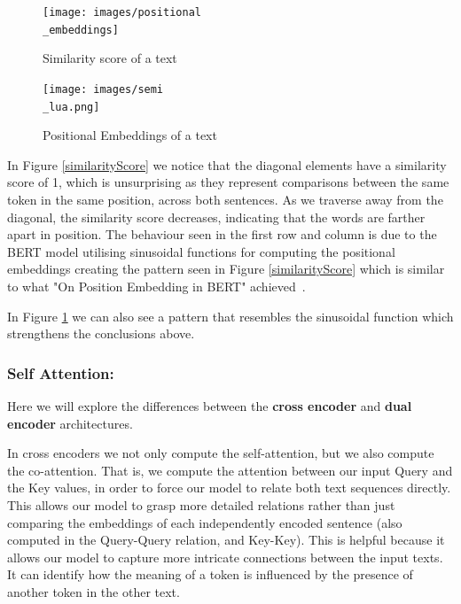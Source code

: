 \documentclass[runningheads]{llncs}
\begin{document}
\begin{figure}[htbp]
    \centering
    \begin{minipage}{0.5\textwidth}
        \centering
        \texttt{[image: images/positional\\\_embeddings]}
        \caption{Similarity score of a text}
        \label{similarityScore}
    \end{minipage}\hfill
    \begin{minipage}{0.45\textwidth}
        \centering
        \texttt{[image: images/semi\\\_lua.png]}
        \caption{Positional Embeddings of a text}
         \label{posEmb}
    \end{minipage}
\end{figure}

In Figure \ref{similarityScore} we notice that the diagonal elements have a similarity score of 1, which is unsurprising as they represent comparisons between the same token in the same position, across both sentences. As we traverse away from the diagonal, the similarity score decreases, indicating that the words are farther apart in position. The behaviour seen in the first row and column is due to the BERT model utilising sinusoidal functions for computing the positional embeddings creating the pattern seen in Figure \ref{similarityScore} which is similar to what "On Position Embedding in BERT" achieved~\cite{wang2021on}.

In Figure \ref{posEmb} we can also see a pattern that resembles the sinusoidal function which strengthens the conclusions above.
\subsubsection{Self Attention:} 
Here we will explore the differences between the \textbf{cross encoder} and \textbf{dual encoder} architectures.

In cross encoders we not only compute the self-attention, but we also compute the co-attention.
That is, we compute the attention between our input Query and the Key values, in order to force our model to relate both text sequences directly. This allows our model to grasp more detailed relations rather than just comparing the embeddings of each independently encoded sentence (also computed in the Query-Query relation, and Key-Key).
This is helpful because it allows our model to capture more intricate connections between the input texts. It can identify how the meaning of a token is influenced by the presence of another token in the other text.
\end{document}
